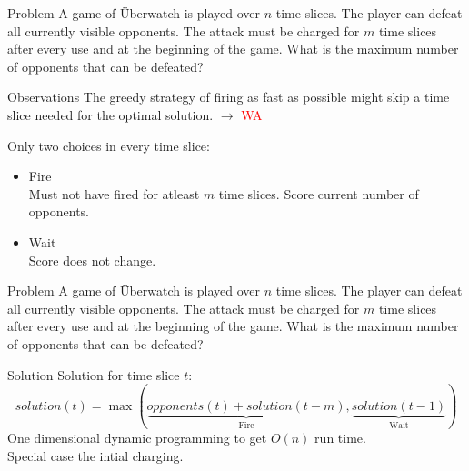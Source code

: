 \begin{slide}
    \begin{block}{Problem}
        A game of Überwatch is played over $n$ time slices. The player can defeat all currently visible opponents. The attack must be charged for $m$ time slices after every use and at the beginning of the game.
        What is the maximum number of opponents that can be defeated?
    \end{block}
    \begin{block}{Observations}
        The greedy strategy of firing as fast as possible might skip a time slice needed for the optimal solution. $\rightarrow$ \textcolor{red}{WA}
        
        Only two choices in every time slice: 
        \begin{itemize}
        \item Fire \\ Must not have fired for atleast $m$ time slices. Score current number of opponents.
        \item Wait \\ Score does not change.
        \end{itemize}        
    \end{block}
\end{slide}


\begin{slide}
    \begin{block}{Problem}
        A game of Überwatch is played over $n$ time slices. The player can defeat all currently visible opponents. The attack must be charged for $m$ time slices after every use and at the beginning of the game.
        What is the maximum number of opponents that can be defeated?
    \end{block}
    \begin{block}{Solution} 
        Solution for time slice $t$:
        \[solution(t) = \max(\underbrace{opponents(t) + solution(t-m)}_{\text{Fire}}, \underbrace{solution(t-1)}_{\text{Wait}})\]
        One dimensional dynamic programming to get $O(n)$ run time.\\
        Special case the intial charging.
    \end{block}
\end{slide}
